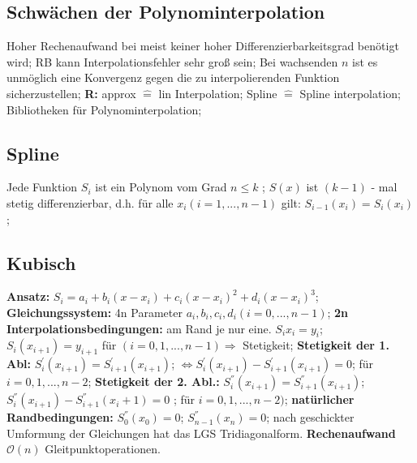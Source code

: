 \subsection{Schwächen der Polynominterpolation}
Hoher Rechenaufwand bei meist keiner hoher Differenzierbarkeitsgrad benötigt wird; RB kann Interpolationsfehler sehr groß sein; Bei wachsenden $n$ ist es unmöglich eine Konvergenz gegen die zu interpolierenden Funktion sicherzustellen;
\textbf{R:} 
approx $\hat{=}$ lin Interpolation; 
Spline $\hat{=}$ Spline interpolation; 
Bibliotheken für Polynominterpolation;
\subsection{Spline}
Jede Funktion $ S_{i} $ ist ein Polynom vom Grad  $ n \le k $ ; 
$ S(x) $ ist $ ( k -1 ) $ - mal stetig differenzierbar, d.h. für alle $ x_{i} ( i = 1, ..., n-1 ) $ gilt: $ S_{ i-1 } ( x_{ i } ) = S_{ i } ( x_{i} ) $; 
\subsection{Kubisch}
\textbf{Ansatz:} $ S_{ i } = a_{ i } + b_{ i } ( x- x_{ i } ) + c_{ i } (x-x_{i})^{2} + d_{i} (x-x_{i})^{3}$; 
\textbf{Gleichungssystem:} 4n Parameter $ a_{i}, b_{i}, c_{i}, d_{i} ( i=0, ..., n-1) $; 
\textbf{2n Interpolationsbedingungen:} am Rand je nur eine. $ S_{i} x_{i} = y_{i}$; 
$ S_i (x_{i+1}) = y_{i+1}$ für $  ( i= 0, 1, ..., n-1) \Rightarrow $ Stetigkeit; 
\textbf{Stetigkeit der 1. Abl:} 
$ S_{i}^{'} (x_{i+1}) = S_{i+1}^{'}(x_{i+1}) $; 
$ \Leftrightarrow S_{i}^{'}(x_{i+1}) - S_{i+1}^{'} ( x_{i+1}) = 0 $; 
für $ i = 0, 1, ..., n-2 $; 
\textbf{Stetigkeit der 2. Abl.:} 
$ S_{i}^{''} (x_{i+1}) = S_{i+1}^{''} (x_{i+1}) $; 
$ S_{i}^{''}(x_{i+1}) - S_{i+1}^{''}(x_{i}+1) = 0 $ ; für $ i=0,1,...,n-2) $; 
\textbf{natürlicher Randbedingungen:}
$ S_{0}^{''}(x_{0}) = 0 $; 
$ S_{n-1}^{''}(x_{n}) = 0 $; 
nach geschickter Umformung der Gleichungen hat das LGS Tridiagonalform. 
\textbf{Rechenaufwand} $ \mathcal O ( n ) $ Gleitpunktoperationen.
